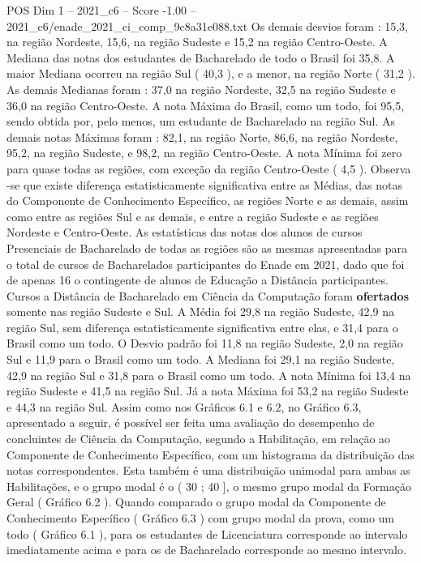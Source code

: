 \begin{textsample}{POS Dim 1 – 2021\_c6 – Score -1.00 – 2021\_c6/enade\_2021\_ci\_comp\_9c8a31e088.txt}
Os demais desvios foram : 15,3, na região Nordeste, 15,6, na região Sudeste e 15,2 na região Centro-Oeste.
A Mediana das notas dos estudantes de Bacharelado de todo o Brasil foi 35,8.
A maior Mediana ocorreu na região Sul ( 40,3 ), e a menor, na região Norte ( 31,2 ).
As demais Medianas foram : 37,0 na região Nordeste, 32,5 na região Sudeste e 36,0 na região Centro-Oeste.
A nota Máxima do Brasil, como um todo, foi 95,5, sendo obtida por, pelo menos, um estudante de Bacharelado na região Sul.
As demais notas Máximas foram : 82,1, na região Norte, 86,6, na região Nordeste, 95,2, na região Sudeste, e 98,2, na região Centro-Oeste.
A nota Mínima foi zero para quase todas as regiões, com exceção da região Centro-Oeste ( 4,5 ).
Observa -se que existe diferença estatisticamente significativa entre as Médias, das notas do Componente de Conhecimento Específico, as regiões Norte e as demais, assim como entre as regiões Sul e as demais, e entre a região Sudeste e as regiões Nordeste e Centro-Oeste.
As estatísticas das notas dos alunos de cursos Presenciais de Bacharelado de todas as regiões são as mesmas apresentadas para o total de cursos de Bacharelados participantes do Enade em 2021, dado que foi de apenas 16 o contingente de alunos de Educação a Distância participantes.
Cursos a Distância de Bacharelado em Ciência da Computação foram \textbf{ofertados} somente nas região Sudeste e Sul.
A Média foi 29,8 na região Sudeste, 42,9 na região Sul, sem diferença estatisticamente significativa entre elas, e 31,4 para o Brasil como um todo.
O Desvio padrão foi 11,8 na região Sudeste, 2,0 na região Sul e 11,9 para o Brasil como um todo.
A Mediana foi 29,1 na região Sudeste, 42,9 na região Sul e 31,8 para o Brasil como um todo.
A nota Mínima foi 13,4 na região Sudeste e 41,5 na região Sul.
Já a nota Máxima foi 53,2 na região Sudeste e 44,3 na região Sul.
Assim como nos Gráficos 6.1 e 6.2, no Gráfico 6.3, apresentado a seguir, é possível ser feita uma avaliação do desempenho de concluintes de Ciência da Computação, segundo a Habilitação, em relação ao Componente de Conhecimento Específico, com um histograma da distribuição das notas correspondentes.
Esta também é uma distribuição unimodal para ambas as Habilitações, e o grupo modal é o ( 30 ; 40 ], o mesmo grupo modal da Formação Geral ( Gráfico 6.2 ).
Quando comparado o grupo modal da Componente de Conhecimento Específico ( Gráfico 6.3 ) com grupo modal da prova, como um todo ( Gráfico 6.1 ), para os estudantes de Licenciatura corresponde ao intervalo imediatamente acima e para os de Bacharelado corresponde ao mesmo intervalo.

\end{textsample}
